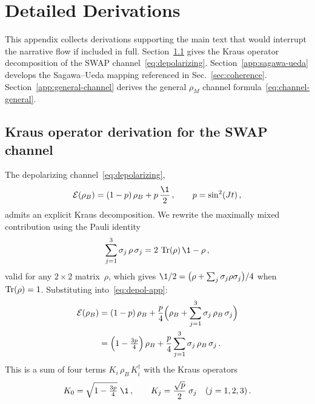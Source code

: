 
\section{Detailed Derivations}\label{app:derivations}

This appendix collects derivations supporting the main text that would
interrupt the narrative flow if included in full.
Section~\ref{app:kraus} gives the Kraus operator decomposition of the
SWAP channel~\eqref{eq:depolarizing}.
Section~\ref{app:sagawa-ueda} develops the Sagawa--Ueda mapping
referenced in Sec.~\ref{sec:coherence}.
Section~\ref{app:general-channel} derives the general $\rho_M$ channel
formula~\eqref{eq:channel-general}.

\subsection{Kraus operator derivation for the SWAP
  channel}\label{app:kraus}

The depolarizing channel~\eqref{eq:depolarizing},
\begin{equation}
  \mathcal{E}(\rho_B)
  = (1-p)\,\rho_B + p\,\frac{\1}{2} \,,
  \qquad p = \sin^2(Jt) \,,
  \label{eq:depol-app}
\end{equation}
admits an explicit Kraus decomposition.  We rewrite the maximally
mixed contribution using the Pauli identity
\begin{equation}
  \sum_{j=1}^{3} \sigma_j\,\rho\,\sigma_j
  = 2\,\Tr(\rho)\,\1 - \rho \,,
  \label{eq:pauli-identity}
\end{equation}
valid for any $2\times 2$ matrix~$\rho$, which gives
$\1/2 = \bigl(\rho + \sum_j \sigma_j\rho\sigma_j\bigr)/4$
when $\operatorname{Tr}(\rho) = 1$.  Substituting into~\eqref{eq:depol-app}:
\begin{align}
  \mathcal{E}(\rho_B)
  &= (1-p)\,\rho_B
    + \frac{p}{4}\Bigl(\rho_B
    + \sum_{j=1}^{3}\sigma_j\,\rho_B\,\sigma_j\Bigr)
  \notag\\
  &= \Bigl(1 - \tfrac{3p}{4}\Bigr)\,\rho_B
    + \frac{p}{4}\sum_{j=1}^{3}\sigma_j\,\rho_B\,\sigma_j \,.
  \label{eq:depol-expanded}
\end{align}
This is a sum of four terms $K_i\,\rho_B\,K_i^\dagger$ with the Kraus
operators
\begin{equation}
  K_0 = \sqrt{1 - \tfrac{3p}{4}}\;\1 \,,
  \qquad
  K_j = \frac{\sqrt{p}}{2}\;\sigma_j
  \quad (j = 1,2,3) \,.
  \label{eq:kraus-app}
\end{equation}

